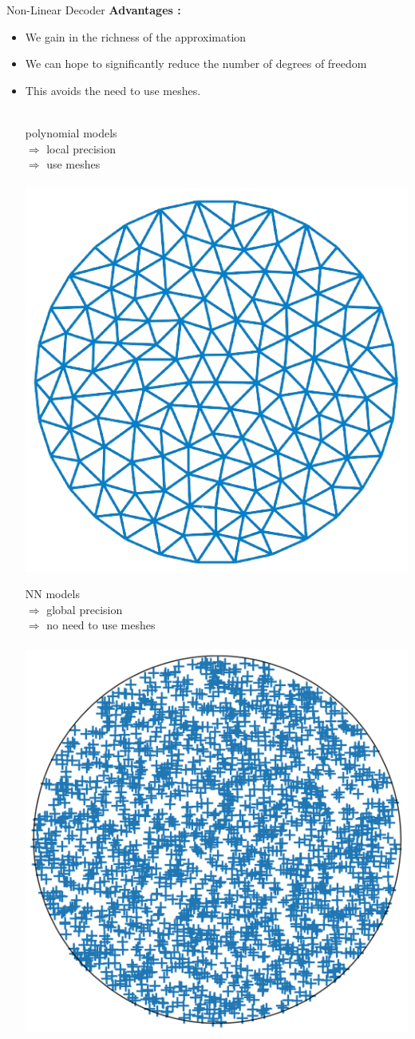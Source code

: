 \begin{frame}{Non-Linear Decoder}
	\textbf{Advantages :}
	\begin{itemize}[\textbullet]
		\item We gain in the richness of the approximation
		\item We can hope to significantly reduce the number of degrees of freedom
		\item This avoids the need to use meshes. \\ \; \\
		
		\begin{center}
			\begin{minipage}{0.4\linewidth}
				polynomial models \\
				$\Rightarrow$ local precision \\
				$\Rightarrow$ use meshes \\ \; \\
				\centering
				\includegraphics[width=0.6\linewidth]{images/pinns/nonlineardecoder_mesh.png}
			\end{minipage} \quad \vline \quad
			\begin{minipage}{0.4\linewidth}
				NN models \\
				$\Rightarrow$ global precision \\
				$\Rightarrow$ no need to use meshes \\ \; \\
				\centering
				\includegraphics[width=0.6\linewidth]{images/pinns/nonlineardecoder_random.png}
			\end{minipage}
		\end{center}
	\end{itemize}
\end{frame}

